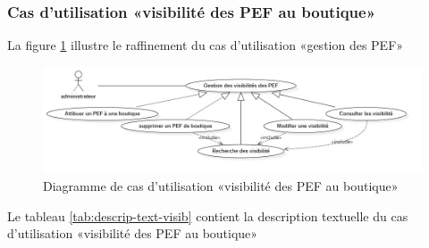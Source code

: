 \subsubsection{Cas d’utilisation «visibilité des PEF au boutique»}
La figure \ref{fig:usecase-gestion-visibilite} illustre le raffinement du cas d’utilisation «gestion des PEF»

\begin{figure}[H]
	\centering
	\includegraphics[width=1\linewidth]{"img/conception/usecases/sprint 3/usecase-gestion-visibilite"}
	\caption[Cas d’utilisation «visibilité des PEF au boutique»]{Diagramme de cas d’utilisation «visibilité des PEF au boutique»}
	\label{fig:usecase-gestion-visibilite}
\end{figure}

Le tableau \ref{tab:descrip-text-visib} contient la description textuelle du cas d’utilisation «visibilité des PEF au boutique»

